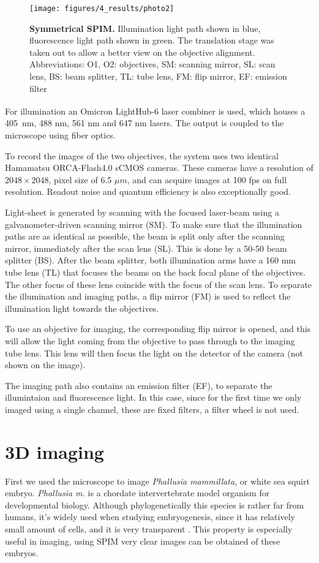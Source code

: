 \documentclass{tdk_style}
\begin{document}
\begin{figure}[htbp]
	\centering
	\texttt{[image: figures/4\_results/photo2]}
	\caption{\textbf{Symmetrical SPIM.} Illumination light path shown in blue, fluorescence light path shown in green. The translation stage was taken out to allow a better view on the objective alignment. Abbreviations: O1, O2: objectives, SM: scanning mirror, SL: scan lens, BS: beam splitter, TL: tube lens, FM: flip mirror, EF: emission filter}
	\label{fig:photo}
\end{figure}

For illumination an Omicron LightHub\textsuperscript{\textregistered}-6 laser combiner is used, which houses a \mbox{405 nm}, 488 nm, 561 nm and 647 nm lasers. The output is coupled to the microscope using fiber optics.

To record the images of the two objectives, the system uses two identical Hamamatsu ORCA-Flash4.0 sCMOS cameras. These cameras have a resolution of $2048 \times 2048$, pixel size of 6.5 $\mu m$, and can acquire images at 100 fps on full resolution. Readout noise and quantum efficiency is also exceptionally good.

Light-sheet is generated by scanning with the focused laser-beam using a galvanometer-driven scanning mirror (SM). To make sure that the illumination paths are as identical as possible, the beam is split only after the scanning mirror, immediately after the scan lens (SL). This is done by a 50-50 beam splitter (BS). After the beam splitter, both illumination arms have a 160 mm tube lens (TL) that focuses the beams on the back focal plane of the objectives. The other focus of these lens coincide with the focus of the scan lens. To separate the illumination and imaging paths, a flip mirror (FM) is used to reflect the illumination light towards the objectives.

To use an objective for imaging, the corresponding flip mirror is opened, and this will allow the light coming from the objective to pass through to the imaging tube lens. This lens will then focus the light on the detector of the camera (not shown on the image).

The imaging path also contains an emission filter (EF), to separate the illumintaion and fluorescence light. In this case, since for the first time we only imaged using a single channel, these are fixed filters, a filter wheel is not used.



\section{3D imaging}
First we used the microscope to image \textit{Phallusia mammillata}, or white sea squirt embryo. \textit{Phallusia m.} is a chordate intervertebrate model organism for developmental biology. Although phylogenetically this species is rather far from humans, it's widely used when studying embryogenesis, since it has relatively small amount of cells, and it is very transparent \cite{ettensohn_methods_2004}. This property is especially useful in imaging, using SPIM very clear images can be obtained of these embryos.
\end{document}
